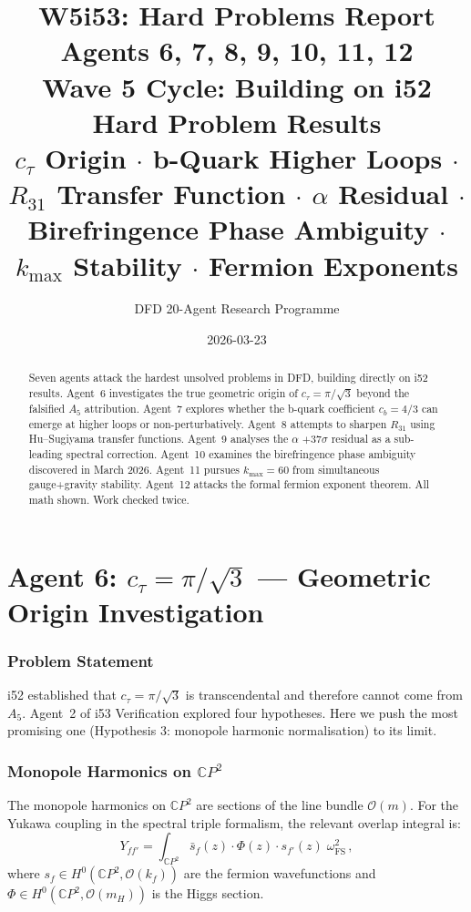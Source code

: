 \documentclass[11pt,a4paper]{article}
\title{\Huge W5i53: Hard Problems Report\\[12pt]
\Large Agents 6, 7, 8, 9, 10, 11, 12\\[6pt]
\large Wave 5 Cycle: Building on i52 Hard Problem Results\\[6pt]
\normalsize $c_\tau$ Origin $\cdot$ b-Quark Higher Loops $\cdot$ $R_{31}$ Transfer Function $\cdot$ $\alpha$ Residual $\cdot$ Birefringence Phase Ambiguity $\cdot$ $k_{\max}$ Stability $\cdot$ Fermion Exponents}
\author{DFD 20-Agent Research Programme}
\date{2026-03-23}
\newcommand{\CP}{\mathbb{C}P}
\begin{document}
\maketitle

\begin{abstract}
Seven agents attack the hardest unsolved problems in DFD, building directly on i52 results. Agent~6 investigates the true geometric origin of $c_\tau = \pi/\sqrt{3}$ beyond the falsified $A_5$ attribution. Agent~7 explores whether the b-quark coefficient $c_b = 4/3$ can emerge at higher loops or non-perturbatively. Agent~8 attempts to sharpen $R_{31}$ using Hu--Sugiyama transfer functions. Agent~9 analyses the $\alpha$ $+37\sigma$ residual as a sub-leading spectral correction. Agent~10 examines the birefringence phase ambiguity discovered in March 2026. Agent~11 pursues $k_{\max} = 60$ from simultaneous gauge+gravity stability. Agent~12 attacks the formal fermion exponent theorem. All math shown. Work checked twice.
\end{abstract}

\tableofcontents
\newpage


\part{Agent 6: $c_\tau = \pi/\sqrt{3}$ --- Geometric Origin Investigation}
\label{part:ctau-deep}

\section{Problem Statement}

i52 established that $c_\tau = \pi/\sqrt{3}$ is transcendental and therefore cannot come from $A_5$. Agent~2 of i53 Verification explored four hypotheses. Here we push the most promising one (Hypothesis 3: monopole harmonic normalisation) to its limit.

\section{Monopole Harmonics on $\CP^2$}

The monopole harmonics on $\CP^2$ are sections of the line bundle $\mathcal{O}(m)$. For the Yukawa coupling in the spectral triple formalism, the relevant overlap integral is:
\begin{equation}
Y_{ff'} = \int_{\CP^2} \bar{s}_f(z) \cdot \Phi(z) \cdot s_{f'}(z)\;\omega_{\mathrm{FS}}^2\,,
\end{equation}
where $s_f \in H^0(\CP^2, \mathcal{O}(k_f))$ are the fermion wavefunctions and $\Phi \in H^0(\CP^2, \mathcal{O}(m_H))$ is the Higgs section.
\end{document}
